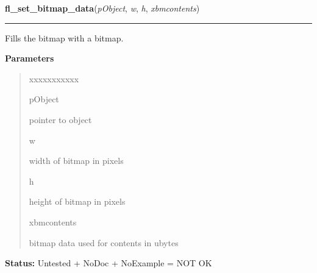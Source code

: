     \label{xformslib:library:fl_set_bitmap_data}

    \vspace{0.5ex}

\hspace{.8\funcindent}\begin{boxedminipage}{\funcwidth}

    \raggedright \textbf{fl\_set\_bitmap\_data}(\textit{pObject}, \textit{w}, \textit{h}, \textit{xbmcontents})

    \vspace{-1.5ex}

    \rule{\textwidth}{0.5\fboxrule}
\setlength{\parskip}{2ex}
    Fills the bitmap with a bitmap.

\setlength{\parskip}{1ex}
      \textbf{Parameters}
      \vspace{-1ex}

      \begin{quote}
        \begin{Ventry}{xxxxxxxxxxx}

          \item[pObject]

          pointer to object

          \item[w]

          width of bitmap in pixels

          \item[h]

          height of bitmap in pixels

          \item[xbmcontents]

          bitmap data used for contents in ubytes

        \end{Ventry}

      \end{quote}

\textbf{Status:} Untested + NoDoc + NoExample = NOT OK



    \end{boxedminipage}

    \label{xformslib:library:fl_set_bitmap_file}

